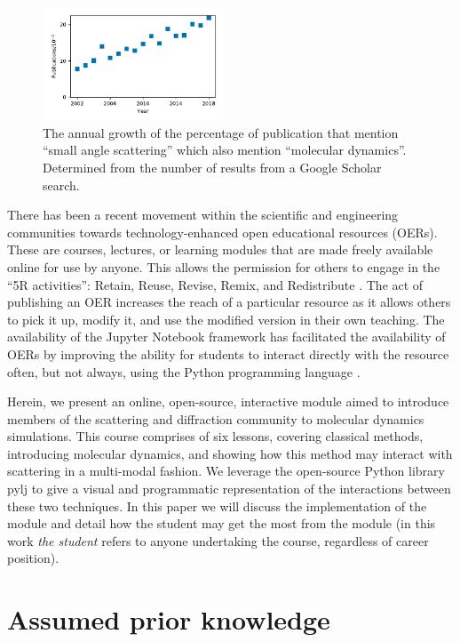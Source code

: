 \documentclass[amsmath,amssymb,twocolumn,superscriptaddress]{revtex4-1}
\begin{document}
%
\begin{figure}
\label{fig:growth}
\includegraphics[width=0.48\textwidth]{figures/chem_data_py.pdf}
\caption{The annual growth of the percentage of publication that mention ``small angle scattering'' which also mention ``molecular dynamics''. Determined from the number of results from a Google Scholar search.}
\end{figure}
%

There has been a recent movement within the scientific and engineering communities towards technology-enhanced open educational resources (OERs).
These are courses, lectures, or learning modules that are made freely available online for use by anyone.
This allows the permission for others to engage in the ``5R activities'': Retain, Reuse, Revise, Remix, and Redistribute \cite{opencontent2018}.
The act of publishing an OER increases the reach of a particular resource as it allows others to pick it up, modify it, and use the modified version in their own teaching.
The availability of the Jupyter Notebook framework \cite{Kluyver2016} has facilitated the availability of OERs by improving the ability for students to interact directly with the resource often, but not always, using the Python programming language \cite{Barba2017}.

Herein, we present an online, open-source, interactive module aimed to introduce members of the scattering and diffraction community to molecular dynamics simulations.
This course comprises of six lessons, covering classical methods, introducing molecular dynamics, and showing how this method may interact with scattering in a multi-modal fashion.
We leverage the open-source Python library pylj \cite{McCluskey2018} to give a visual and programmatic representation of the interactions between these two techniques.
In this paper we will discuss the implementation of the module and detail how the student may get the most from the module (in this work \emph{the student} refers to anyone undertaking the course, regardless of career position).

\section{Assumed prior knowledge}
\end{document}
